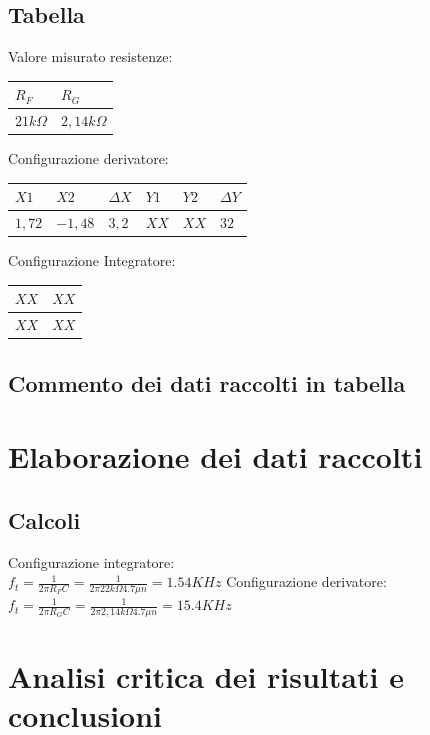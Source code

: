 \documentclass[12pt]{article}
\begin{document}
\subsection{Tabella}
Valore misurato resistenze:\\
\begin{center}
        \begin{tabular}{|p{2cm}|p{2cm}|}
            \hline
            \rowcolor{RoyalBlue} $R_F$ & $R_G$ \\
            \hline
            \rowcolor{CornflowerBlue} $21k\Omega$ & $2,14k\Omega$  \\ 
            \hline
        \end{tabular}
        \label{Valore resistenze}
\end{center}
\noindent
Configurazione derivatore:\\
\begin{center}
    \begin{tabular}{|p{2cm} |p{2cm}|p{2cm} |p{2cm}|p{2cm} |p{2cm}|}
        \hline
        \rowcolor{RoyalBlue} $X1$ & $X2$& $\Delta X$ & $Y1$ & $Y2$ & $\Delta Y$   \\
        \hline
        \rowcolor{CornflowerBlue} $1,72$ & $-1,48$ & $3,2$ & $XX$ & $XX$  & $32$\\ 
        \hline
    \end{tabular}
\end{center}

Configurazione Integratore:\\
\begin{center}
    \begin{tabular}{|p{2cm} |p{2cm}|}
        \hline
        \rowcolor{RoyalBlue} $XX$ & $XX$  \\
        \hline
        \rowcolor{CornflowerBlue} $XX$ & $XX$  \\ 
        \hline
    \end{tabular}
    \label{Valore resistenze}
\end{center}

\subsection{Commento dei dati raccolti in tabella}

\section{Elaborazione dei dati raccolti}
\subsection{Calcoli}
Configurazione integratore:\\
$f_t=\frac{1}{2 \pi R_F C}=\frac{1}{2 \pi 22 k\Omega 4.7\mu n }=1.54KHz$
Configurazione derivatore:\\
$f_t=\frac{1}{2 \pi R_G C}=\frac{1}{2 \pi 2,14 k\Omega 4.7\mu n }=15.4KHz$
\section{Analisi critica dei risultati e conclusioni}
\end{document}
